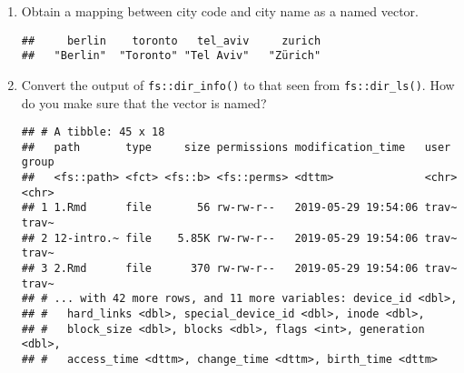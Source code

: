 \documentclass[]{book}
\newenvironment{Shaded}{\begin{snugshade}}{\end{snugshade}}
\newcommand{\CommentTok}[1]{\textcolor[rgb]{0.56,0.35,0.01}{\textit{#1}}}
\newcommand{\KeywordTok}[1]{\textcolor[rgb]{0.13,0.29,0.53}{\textbf{#1}}}
\newcommand{\NormalTok}[1]{#1}
\newcommand{\OperatorTok}[1]{\textcolor[rgb]{0.81,0.36,0.00}{\textbf{#1}}}
\newcommand{\StringTok}[1]{\textcolor[rgb]{0.31,0.60,0.02}{#1}}
\begin{document}
\begin{enumerate}
\def\labelenumi{\arabic{enumi}.}
\item
  Obtain a mapping between city code and city name as a named vector.

\begin{Shaded}
\end{Shaded}

\begin{verbatim}
##     berlin    toronto   tel_aviv     zurich 
##   "Berlin"  "Toronto" "Tel Aviv"   "Zürich"
\end{verbatim}
\item
  Convert the output of \texttt{fs::dir\_info()} to that seen from \texttt{fs::dir\_ls()}. How do you make sure that the vector is named?

\begin{Shaded}
\end{Shaded}

\begin{verbatim}
## # A tibble: 45 x 18
##   path       type     size permissions modification_time   user  group
##   <fs::path> <fct> <fs::b> <fs::perms> <dttm>              <chr> <chr>
## 1 1.Rmd      file       56 rw-rw-r--   2019-05-29 19:54:06 trav~ trav~
## 2 12-intro.~ file    5.85K rw-rw-r--   2019-05-29 19:54:06 trav~ trav~
## 3 2.Rmd      file      370 rw-rw-r--   2019-05-29 19:54:06 trav~ trav~
## # ... with 42 more rows, and 11 more variables: device_id <dbl>,
## #   hard_links <dbl>, special_device_id <dbl>, inode <dbl>,
## #   block_size <dbl>, blocks <dbl>, flags <int>, generation <dbl>,
## #   access_time <dttm>, change_time <dttm>, birth_time <dttm>
\end{verbatim}


\end{enumerate}
\end{document}
